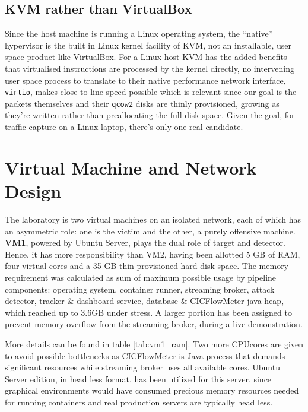 \subsection{KVM rather than VirtualBox}
\label{sec:conception_kvm}

Since the host machine is running a Linux operating system, the “native” hypervisor is the built in Linux kernel facility of KVM, not an installable, user space product like VirtualBox. For a Linux host KVM has the added benefits that virtualised instructions are processed by the kernel directly, no intervening user space process to translate to their native performance network interface, \texttt{virtio}, makes close to line speed possible which is relevant since our goal is the packets themselves and their \texttt{qcow2} disks are thinly provisioned, growing as they’re written rather than preallocating the full disk space. Given the goal, for traffic capture on a Linux laptop, there’s only one real candidate.

\section{Virtual Machine and Network Design}
\label{sec:conception_vmnet}

The laboratory is two virtual machines on an isolated network, each of which has an asymmetric role: one is the victim and the other, a purely offensive machine. \textbf{VM1}, powered by Ubuntu Server, plays the dual role of target and detector. Hence, it has more responsibility than VM2, having been allotted 5 GB of RAM, four virtual cores and a 35 GB thin provisioned hard disk space. The memory requirement was calculated as sum of maximum possible usage by pipeline components: operating system, container runner, streaming broker, attack detector, tracker \& dashboard service, database \& CICFlowMeter java heap, which reached up to 3.6GB under stress. 
A larger portion has been assigned to prevent memory overflow from the streaming broker, during a live demonstration. 

More details can be found in table \ref{tab:vm1_ram}. Two more CPUcores are given to avoid possible bottlenecks as CICFlowMeter is Java process that demands significant resources while streaming broker uses all available cores. Ubuntu Server edition, in head less format, has been utilized for this server, since graphical environments would have consumed precious memory resources needed for running containers and real production servers are typically head less.

